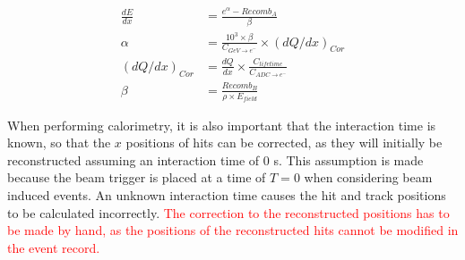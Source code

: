 \begin{subequations}
  \label{eq:ModBox}
  \begin{align}
    \frac{dE}{dx} &= \frac{ e^{\alpha} - Recomb_{A} }{ \beta } \label{eq:ModBox_1} \\
    \alpha &= \frac{10^3 \times \beta }{ C_{GeV \rightarrow e^{-} } } \times (dQ/dx)_{Cor} \label{eq:ModBox_A}\\
    (dQ/dx)_{Cor} &= \frac{dQ}{dx} \times \frac{ C_{lifetime} }{ C_{ADC \rightarrow e^{-}} } \label{eq:ModBox_Correc} \\
    \beta &= \frac{ Recomb_{B} }{ \rho \times E_{field} } \label{eq:ModBox_B}
  \end{align}
\end{subequations}

When performing calorimetry, it is also important that the interaction time is known, so that the $x$ positions of hits can be corrected, as they will initially be reconstructed assuming an interaction time of 0 s. This assumption is made because the beam trigger is placed at a time of $T = 0$ when considering beam induced events. An unknown interaction time causes the hit and track positions to be calculated incorrectly. \textcolor{red}{The correction to the reconstructed positions has to be made by hand, as the positions of the reconstructed hits cannot be modified in the event record.}
